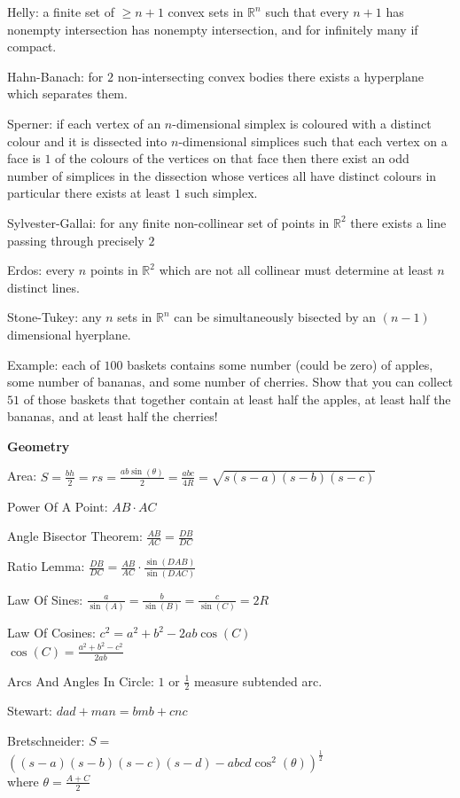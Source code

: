 Helly: a finite set of $\ge n+1$ convex sets in $\mathbb{R}^n$ such that every $n+1$ has nonempty intersection has nonempty intersection, and for infinitely many if compact.

Hahn-Banach: for $2$ non-intersecting convex bodies there exists a hyperplane which separates them.

Sperner: if each vertex of an $n$-dimensional simplex is coloured with a distinct colour and it is dissected into $n$-dimensional simplices such that each vertex on a face is $1$ of the colours of the vertices on that face then there exist an odd number of simplices in the dissection whose vertices all have distinct colours in particular there exists at least $1$ such simplex.

Sylvester-Gallai: for any finite non-collinear set of points in $\mathbb{R}^2$ there exists a line passing through precisely $2$

Erdos: every $n$ points in $\mathbb{R}^2$ which are not all collinear must determine at least $n$ distinct lines.

Stone-Tukey: any $n$ sets in $\mathbb{R}^n$ can be simultaneously bisected by an $(n-1)$ dimensional hyerplane.

Example: each of $100$ baskets contains some number (could be zero) of apples, some number of bananas, and some number of cherries. Show that you can collect $51$ of those baskets that together contain at least half the apples, at least half the bananas, and at least half the cherries!

\newpage

\textbf{Geometry}

Area: $S=\frac{bh}{2}=rs=\frac{ab\sin(\theta)}{2}=\frac{abc}{4R}=\sqrt{s(s-a)(s-b)(s-c)}$

Power Of A Point: $AB \cdot AC$

Angle Bisector Theorem: $\frac{AB}{AC}=\frac{DB}{DC}$

Ratio Lemma: $\frac{DB}{DC}=\frac{AB}{AC} \cdot \frac{\sin(DAB)}{\sin(DAC)}$

Law Of Sines: $\frac{a}{\sin(A)}=\frac{b}{\sin(B)}=\frac{c}{\sin(C)}=2R$

Law Of Cosines: $c^2=a^2+b^2-2ab\cos(C)$ \\
$\cos(C)=\frac{a^2+b^2-c^2}{2ab}$

Arcs And Angles In Circle: $1$ or $\frac{1}{2}$ measure subtended arc.

Stewart: $dad+man=bmb+cnc$

Bretschneider: $S=$ \\
$((s-a)(s-b)(s-c)(s-d)-abcd \cos^2 (\theta))^{\frac{1}{2}}$ \\
where $\theta = \frac{A+C}{2}$

